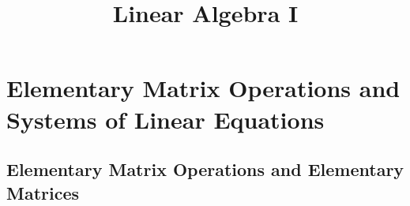 \documentclass{article}
\title{\textbf{Linear Algebra I}}
\theoremstyle{plain}
\begin{document}
\maketitle
\setcounter{section}{2}
\section{Elementary Matrix Operations and Systems of Linear Equations}
\subsection{Elementary Matrix Operations and Elementary Matrices}
\end{document}
